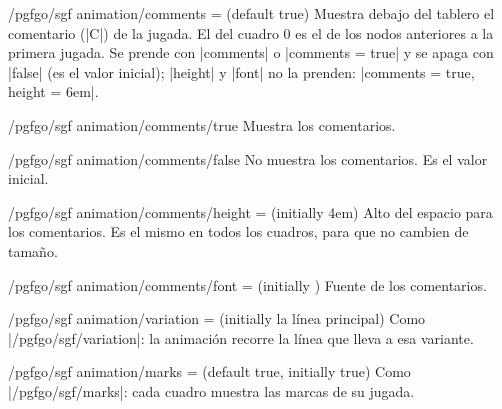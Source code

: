 \begin{key}{/pgfgo/sgf animation/comments =  (default true)}
	Muestra debajo del tablero el comentario (|C|) de la jugada. El del cuadro 0 es el de los nodos anteriores a la primera jugada. Se prende con |comments| o |comments = true| y se apaga con |false| (es el valor inicial); |height| y |font| no la prenden: |comments = {true, height = 6em}|.
\end{key}

\begin{stylekey}{/pgfgo/sgf animation/comments/true}
	Muestra los comentarios.
\end{stylekey}

\begin{stylekey}{/pgfgo/sgf animation/comments/false}
	No muestra los comentarios. Es el valor inicial.
\end{stylekey}

\begin{key}{/pgfgo/sgf animation/comments/height =  (initially 4em)}
	Alto del espacio para los comentarios. Es el mismo en todos los cuadros, para que no cambien de tamaño.
\end{key}

\begin{key}{/pgfgo/sgf animation/comments/font =  (initially \texttt{\string\small})}
	Fuente de los comentarios.

	\begin{codeexample}[width=5cm]
	\end{codeexample}
\end{key}

\begin{key}{/pgfgo/sgf animation/variation =  (initially la línea principal)}
	Como |/pgfgo/sgf/variation|: la animación recorre la línea que lleva a esa variante.

	\begin{codeexample}[width=5cm]
	\end{codeexample}
\end{key}

\begin{key}{/pgfgo/sgf animation/marks =  (default true, initially true)}
	Como |/pgfgo/sgf/marks|: cada cuadro muestra las marcas de su jugada.
\end{key}

